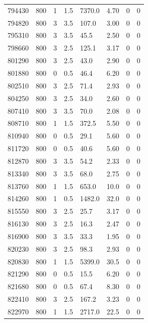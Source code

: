 \documentclass[preview]{standalone}
\begin{document}
{{{{{{{{{\begin{tabular}{L{1.2cm}C{1.2cm} C{0.3cm}C{0.5cm} C{1.4cm}C{1.4cm} C{1.4cm}C{1.4cm}}
  794430  &   800  & 1     & 1.5 &  7370.0  & 4.70  & 0 &  0   \\ 
  794820  &   800  & 3     & 3.5 &  107.0  & 3.00  & 0 &  0   \\ 
  795310  &   800  & 3     & 3.5 &  45.5  & 2.50  & 0 &  0   \\ 
  798660  &   800  & 3     & 2.5 &  125.1  & 3.17  & 0 &  0   \\ 
  801290  &   800  & 3     & 2.5 &  43.0  & 2.90  & 0 &  0   \\ 
  801880  &   800  & 0     & 0.5 &  46.4  & 6.20  & 0 &  0   \\ 
  802510  &   800  & 3     & 2.5 &  71.4  & 2.93  & 0 &  0   \\ 
  804250  &   800  & 3     & 2.5 &  34.0  & 2.60  & 0 &  0   \\ 
  807410  &   800  & 3     & 3.5 &  70.0  & 2.08  & 0 &  0   \\ 
  808710  &   800  & 1     & 1.5 &  372.5  & 5.50  & 0 &  0   \\ 
  810940  &   800  & 0     & 0.5 &  29.1  & 5.60  & 0 &  0   \\ 
  811720  &   800  & 0     & 0.5 &  40.6  & 5.60  & 0 &  0   \\ 
  812870  &   800  & 3     & 3.5 &  54.2  & 2.33  & 0 &  0   \\ 
  813340  &   800  & 3     & 3.5 &  68.0  & 2.75  & 0 &  0   \\ 
  813760  &   800  & 1     & 1.5 &  653.0  & 10.0  & 0 &  0   \\ 
  814260  &   800  & 1     & 0.5 &  1482.0  & 32.0  & 0 &  0   \\ 
  815550  &   800  & 3     & 2.5 &  25.7  & 3.17  & 0 &  0   \\ 
  816130  &   800  & 3     & 2.5 &  16.3  & 2.47  & 0 &  0   \\ 
  816900  &   800  & 3     & 3.5 &  33.3  & 1.95  & 0 &  0   \\ 
  820230  &   800  & 3     & 2.5 &  98.3  & 2.93  & 0 &  0   \\ 
  820830  &   800  & 1     & 1.5 &  5399.0  & 30.5  & 0 &  0   \\ 
  821290  &   800  & 0     & 0.5 &  15.5  & 6.20  & 0 &  0   \\ 
  821680  &   800  & 0     & 0.5 &  67.4  & 8.30  & 0 &  0   \\ 
  822410  &   800  & 3     & 2.5 &  167.2  & 3.23  & 0 &  0   \\ 
  822970  &   800  & 1     & 1.5 &  2717.0  & 22.5  & 0 &  0   \\ 
\hline 
\end{tabular} 

}}}}}}}}}
\end{document}
